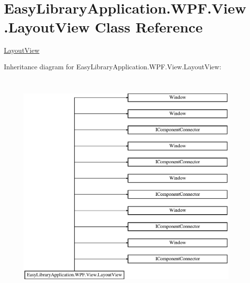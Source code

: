 \hypertarget{class_easy_library_application_1_1_w_p_f_1_1_view_1_1_layout_view}{}\section{Easy\+Library\+Application.\+W\+P\+F.\+View.\+Layout\+View Class Reference}
\label{class_easy_library_application_1_1_w_p_f_1_1_view_1_1_layout_view}


\mbox{\hyperlink{class_easy_library_application_1_1_w_p_f_1_1_view_1_1_layout_view}{Layout\+View}}  


Inheritance diagram for Easy\+Library\+Application.\+W\+P\+F.\+View.\+Layout\+View\+:\begin{figure}[H]
\begin{center}
\leavevmode
\includegraphics[height=11.789474cm]{class_easy_library_application_1_1_w_p_f_1_1_view_1_1_layout_view}
\end{center}
\end{figure}
